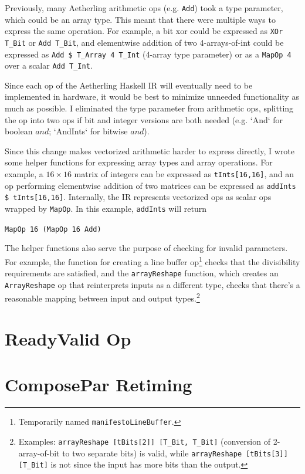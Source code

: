 \documentclass[12pt]{article}
\begin{document}
Previously, many Aetherling arithmetic ops (e.g. \texttt{Add}) took a
type parameter, which could be an array type. This meant that there
were multiple ways to express the same operation. For example, a bit
xor could be expressed as \texttt{XOr T\_Bit} or \texttt{Add T\_Bit},
and elementwise addition of two 4-arrays-of-int could be expressed
as \texttt{Add \$ T\_Array 4 T\_Int} (4-array type parameter) or
as a \texttt{MapOp 4} over a scalar \texttt{Add T\_Int}.

Since each op of the Aetherling Haskell IR will eventually need to be
implemented in hardware, it would be best to minimize unneeded
functionality as much as possible. I eliminated the type parameter
from arithmetic ops, splitting the op into two ops if bit and integer
versions are both needed (e.g. `And` for boolean $and$; `AndInts` for
bitwise $and$).

Since this change makes vectorized arithmetic harder to express
directly, I wrote some helper functions for expressing array types and
array operations. For example, a $16\times 16$ matrix of integers can
be expressed as \texttt{tInts[16,16]}, and an op performing
elementwise addition of two matrices can be expressed as
\texttt{addInts \$ tInts[16,16]}. Internally, the IR represents
vectorized ops as scalar ops wrapped by \texttt{MapOp}.
In this example, \texttt{addInts} will return

\texttt{MapOp 16 (MapOp 16 Add)}

The helper functions also serve the purpose of checking for invalid
parameters. For example, the function for creating a line buffer
op\footnote{Temporarily named \texttt{manifestoLineBuffer}.} checks that the
divisibility requirements are satisfied, and the \texttt{arrayReshape}
function, which creates an \texttt{ArrayReshape} op that reinterprets
inputs as a different type, checks that there's a reasonable mapping
between input and output types.\footnote{
Examples: \texttt{arrayReshape [tBits[2]] [T\_Bit, T\_Bit]} (conversion of
2-array-of-bit to two separate bits) is valid, while
\texttt{arrayReshape [tBits[3]] [T\_Bit]} is not since the input has
more bits than the output.}

\section{ReadyValid Op}

\section{ComposePar Retiming}
\end{document}
